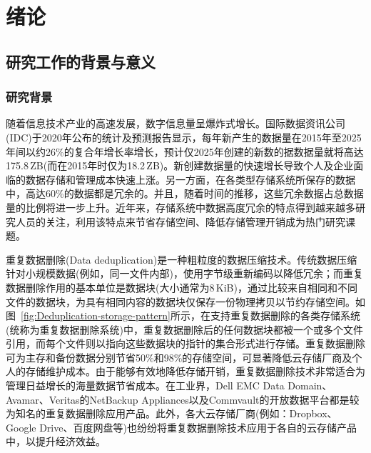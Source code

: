 \chapter{绪\hspace{6pt}论}
\label{chapter:introduction}

\section{研究工作的背景与意义}
\label{sec:intro}
\subsection{研究背景}
\label{subsec:intro-background}

随着信息技术产业的高速发展，数字信息量呈爆炸式增长。国际数据资讯公司(IDC)\cite{IDC}于2020年公布的统计及预测报告\cite{DataReport2020}显示，每年新产生的数据量在2015年至2025年间以约26\%的复合年增长率增长，预计仅2025年创建的新数的据数据量就将高达175.8\,ZB(而在2015年时仅为18.2\,ZB)。新创建数据量的快速增长导致个人及企业面临的数据存储和管理成本快速上涨\cite{敖莉2010重复数据删除技术}。另一方面，在各类型存储系统所保存的数据中，高达60\%的数据都是冗余的。并且，随着时间的推移，这些冗余数据占总数据量的比例将进一步上升\cite{mcknight2006digital}。近年来，存储系统中数据高度冗余的特点得到越来越多研究人员的关注，利用该特点来节省存储空间、降低存储管理开销成为热门研究课题。

重复数据删除(Data deduplication)\cite{付印金2012重复数据删除关键技术研究进展, 敖莉2010重复数据删除技术,xia2016Deduplication,Paulo2014}是一种粗粒度的数据压缩技术。传统数据压缩针对小规模数据(例如，同一文件内部)，使用字节级重新编码以降低冗余；而重复数据删除作用的基本单位是数据块(大小通常为8\,KiB)，通过比较来自相同和不同文件的数据块，为具有相同内容的数据块仅保存一份物理拷贝以节约存储空间。如图~\ref{fig:Deduplication-storage-pattern}所示，在支持重复数据删除的各类存储系统(统称为重复数据删除系统)中，重复数据删除后的任何数据块都被一个或多个文件引用，而每个文件则以指向这些数据块的指针的集合形式进行存储。重复数据删除可为主存和备份数据分别节省50\%\cite{meyer2011deduplication}和98\%\cite{wallace12}的存储空间，可显著降低云存储厂商及个人的存储维护成本\cite{付印金2012重复数据删除关键技术研究进展}。由于能够有效地降低存储开销，重复数据删除技术非常适合为管理日益增长的海量数据节省成本。在工业界，Dell EMC Data Domain\cite{EMCDataDomain}、Avamar\cite{Avamar}、Veritas的NetBackup Appliances\cite{veritas}以及Commvault的开放数据平台\cite{CommVault}都是较为知名的重复数据删除应用产品。此外，各大云存储厂商(例如：Dropbox\cite{Dropbox}、Google Drive\cite{GoogleDrive}、百度网盘\cite{BaiduPan}等)也纷纷将重复数据删除技术应用于各自的云存储产品中，以提升经济效益\cite{harnik2010side}。

